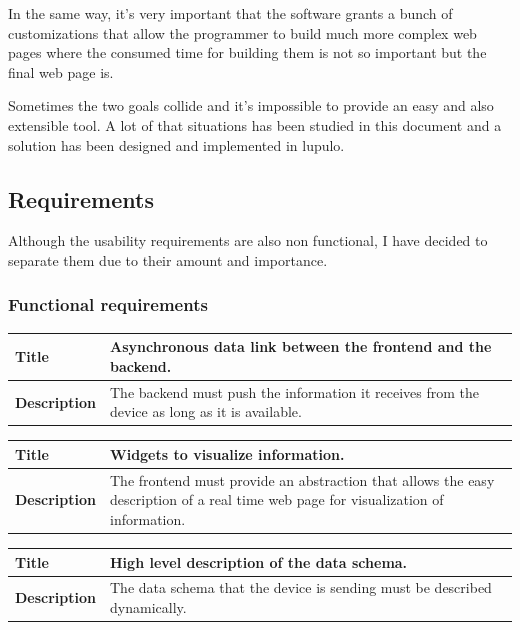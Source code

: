 \documentclass[12pt]{article}
\begin{document}
            In the same way, it's very important that the software grants a
            bunch of customizations that allow the programmer to build much more
            complex web pages where the consumed time for building them is not
            so important but the final web page is.

            Sometimes the two goals collide and it's impossible to provide an
            easy and also extensible tool. A lot of that situations has been
            studied in this document and a solution has been designed and
            implemented in lupulo.

        \subsection{Requirements}
            Although the usability requirements are also non functional, I have
            decided to separate them due to their amount and importance.

            \subsubsection{Functional requirements}
                \setlength{\parindent}{0cm}
                \begin{tabularx}{\textwidth}{|l|X|}
                    \hline
                    \textbf{Title} & Asynchronous data link between the frontend
                    and the backend. \\
                    \hline
                    \textbf{Description} & The backend must push the information
                    it receives from the device as long as it is available. \\
                    \hline
                \end{tabularx}

                \begin{tabularx}{\textwidth}{|l|X|}
                    \hline
                    \textbf{Title} & Widgets to visualize information. \\
                    \hline
                    \textbf{Description} & The frontend must provide an
                    abstraction that allows the easy description of a real time
                    web page for visualization of information. \\
                    \hline
                \end{tabularx}

                \begin{tabularx}{\textwidth}{|l|X|}
                    \hline
                    \textbf{Title} & High level description of the data schema.\\
                    \hline
                    \textbf{Description} & The data schema that the device is
                    sending must be described dynamically. \\
                    \hline
                \end{tabularx}
\end{document}
